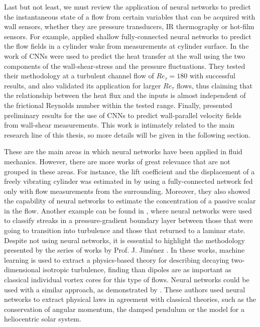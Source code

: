 Last but not least, we must review the application of neural networks to predict the instantaneous state of a flow from certain variables that can be acquired with wall sensors, whether they are pressure transducers, IR thermography or hot-film sensors.
For example, \citet{erichson2020shallow} applied shallow fully-connected neural networks to predict the flow fields in a cylinder wake from measurements at cylinder surface.
In the work of \citet{kim2020prediction} CNNs were used to predict the heat transfer at the wall using the two components of the wall-shear-stress and the pressure fluctuations.
They tested their methodology at a turbulent channel flow of $Re_{\tau}=180$ with successful results, and also validated its application for larger $Re_{\tau}$ flows, thus claiming that the relationship between the heat flux and the inputs is almost independent of the frictional Reynolds number within the tested range.
Finally, \citet{guastoni2020prediction} presented preliminary results for the use of CNNs to predict wall-parallel velocity fields from wall-shear measurements.
This work is intimately related to the main research line of this thesis, so more details will be given in the following section.

These are the main areas in which neural networks have been applied in fluid mechanics.
However, there are more works of great relevance that are not grouped in these areas.
For instance, the lift coefficient and the displacement of a freely vibrating cylinder was estimated in \citet{raissi2019deep} by using a fully-connected network fed only with flow measurements from the surrounding.
Moreover, they also showed the capability of neural networks to estimate the concentration of a passive scalar in the flow.
Another example can be found in \citet{hack2016data}, where neural networks were used to classify streaks in a pressure-gradient boundary layer between those that were going to transition into turbulence and those that returned to a laminar state.
Despite not using neural networks, it is essential to highlight the methodology presented by the series of works by Prof. J. Jiménez \citep{jimenez2018machine,jimenez2020computers,jimenez2020dipoles,jimenez2020monte}.
In these works, machine learning is used to extract a physics-based theory for describing decaying two-dimensional isotropic turbulence, finding than dipoles are as important as classical individual vortex cores for this type of flows.
Neural networks could be used with a similar approach, as demonstrated by \citet{iten2020discovering}.
These authors used neural networks to extract physical laws in agreement with classical theories, such as the conservation of angular momentum, the damped pendulum or the model for a heliocentric solar system.

